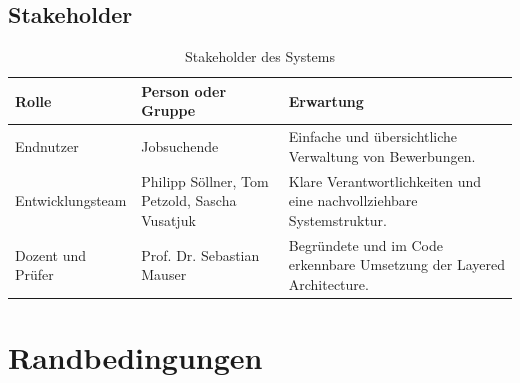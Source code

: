 \documentclass[a4paper,11pt]{article}
\begin{document}
\subsection{Stakeholder}

\begin{table}[H]
\centering
\begin{tabularx}{\textwidth}{L{3.2cm} L{4.2cm} Y}
\toprule
\textbf{Rolle} & \textbf{Person oder Gruppe} & \textbf{Erwartung} \\
\midrule
Endnutzer & Jobsuchende & Einfache und übersichtliche Verwaltung von Bewerbungen. \\
Entwicklungsteam & Philipp Söllner, Tom Petzold, Sascha Vusatjuk & Klare Verantwortlichkeiten und eine nachvollziehbare Systemstruktur. \\
Dozent und Prüfer & Prof. Dr. Sebastian Mauser & Begründete und im Code erkennbare Umsetzung der Layered Architecture. \\
\bottomrule
\end{tabularx}
\caption{Stakeholder des Systems}
\label{tab:stakeholders}
\end{table}






\section{Randbedingungen}
\end{document}
